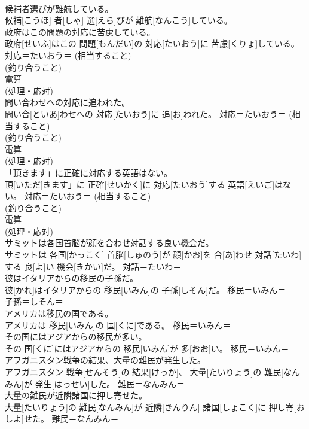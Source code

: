 \documentclass[8pt]{extreport}
\begin{document}
\begin{CJK}{UTF8}{min}
{\\	候補者選びが難航している。	
\\	候補[こうほ] 者[しゃ] 選[えら]びが 難航[なんこう]している。	
\\	政府はこの問題の対応に苦慮している。	
\\	政府[せいふ]はこの 問題[もんだい]の 対応[たいおう]に 苦慮[くりょ]している。	対応＝たいおう＝ (相当すること) 
\\	(釣り合うこと) 
\\	{電算} 
\\	(処理・応対) 
\\	問い合わせへの対応に追われた。	
\\	問い合[といあ]わせへの 対応[たいおう]に 追[お]われた。	対応＝たいおう＝ (相当すること) 
\\	(釣り合うこと) 
\\	{電算} 
\\	(処理・応対) 
\\	「頂きます」に正確に対応する英語はない。	
\\	頂[いただ]きます」に 正確[せいかく]に 対応[たいおう]する 英語[えいご]はない。	対応＝たいおう＝ (相当すること) 
\\	(釣り合うこと) 
\\	{電算} 
\\	(処理・応対) 
\\	サミットは各国首脳が顔を合わせ対話する良い機会だ。	
\\	サミットは 各国[かっこく] 首脳[しゅのう]が 顔[かお]を 合[あ]わせ 対話[たいわ]する 良[よ]い 機会[きかい]だ。	対話＝たいわ＝ 
\\	彼はイタリアからの移民の子孫だ。	
\\	彼[かれ]はイタリアからの 移民[いみん]の 子孫[しそん]だ。	移民＝いみん＝ 
\\	子孫＝しそん＝ 
\\	アメリカは移民の国である。	
\\	アメリカは 移民[いみん]の 国[くに]である。	移民＝いみん＝ 
\\	その国にはアジアからの移民が多い。	
\\	その 国[くに]にはアジアからの 移民[いみん]が 多[おお]い。	移民＝いみん＝ 
\\	アフガニスタン戦争の結果、大量の難民が発生した。	
\\	アフガニスタン 戦争[せんそう]の 結果[けっか]、 大量[たいりょう]の 難民[なんみん]が 発生[はっせい]した。	難民＝なんみん＝ 
\\	大量の難民が近隣諸国に押し寄せた。	
\\	大量[たいりょう]の 難民[なんみん]が 近隣[きんりん] 諸国[しょこく]に 押し寄[おしよ]せた。	難民＝なんみん＝ 
}
\end{CJK}
\end{document}
